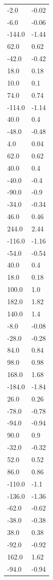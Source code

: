 \begin{longtable}{ll}
-2.0 & -0.02 \\
-6.0 & -0.06 \\
-144.0 & -1.44 \\
62.0 & 0.62 \\
-42.0 & -0.42 \\
18.0 & 0.18 \\
10.0 & 0.1 \\
74.0 & 0.74 \\
-114.0 & -1.14 \\
40.0 & 0.4 \\
-48.0 & -0.48 \\
4.0 & 0.04 \\
62.0 & 0.62 \\
40.0 & 0.4 \\
-40.0 & -0.4 \\
-90.0 & -0.9 \\
-34.0 & -0.34 \\
46.0 & 0.46 \\
244.0 & 2.44 \\
-116.0 & -1.16 \\
-54.0 & -0.54 \\
40.0 & 0.4 \\
18.0 & 0.18 \\
100.0 & 1.0 \\
182.0 & 1.82 \\
140.0 & 1.4 \\
-8.0 & -0.08 \\
-28.0 & -0.28 \\
84.0 & 0.84 \\
98.0 & 0.98 \\
168.0 & 1.68 \\
-184.0 & -1.84 \\
26.0 & 0.26 \\
-78.0 & -0.78 \\
-94.0 & -0.94 \\
90.0 & 0.9 \\
-32.0 & -0.32 \\
52.0 & 0.52 \\
86.0 & 0.86 \\
-110.0 & -1.1 \\
-136.0 & -1.36 \\
-62.0 & -0.62 \\
-38.0 & -0.38 \\
38.0 & 0.38 \\
-92.0 & -0.92 \\
162.0 & 1.62 \\
-94.0 & -0.94 \\

\end{longtable}
